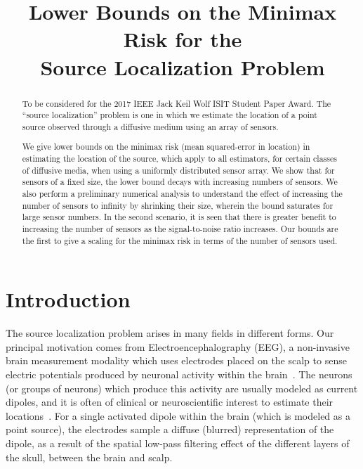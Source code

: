 \documentclass[conference]{IEEEtran}
\title{Lower Bounds on the Minimax Risk for the \\ Source Localization Problem}
\author{
	\IEEEauthorblockN{
		Praveen Venkatesh (\href{mailto:vpraveen@cmu.edu}{\texttt{vpraveen@cmu.edu}}) %
		and Pulkit Grover (\href{mailto:pulkit@cmu.edu}{\texttt{pulkit@cmu.edu}}) %
	}
}
\begin{document}
\maketitle
\thispagestyle{plain}
\pagestyle{plain}

\begin{abstract}

To be considered for the 2017 IEEE Jack Keil Wolf ISIT Student Paper Award.
The ``source localization'' problem is one in which we estimate the location of
a point source observed through a diffusive medium using an array of sensors.

We give lower bounds on the minimax risk (mean squared-error in location) in
estimating the location of the source, which apply to all estimators, for
certain classes of diffusive media, when using a uniformly distributed sensor
array. We show that for sensors of a fixed size, the lower bound decays with
increasing numbers of sensors. We also perform a preliminary numerical analysis
to understand the effect of increasing the number of sensors to infinity by
shrinking their size, wherein the bound saturates for large sensor numbers.  In
the second scenario, it is seen that there is greater benefit to increasing the
number of sensors as the signal-to-noise ratio increases.  Our bounds are the
first to give a scaling for the minimax risk in terms of the number of sensors
used.


\end{abstract}

\section{Introduction}

The source localization problem arises in many fields in different forms. Our
principal motivation comes from Electroencephalography (EEG), a non-invasive
brain measurement modality which uses electrodes placed on the scalp to sense
electric potentials produced by neuronal activity within the
brain~\cite{Nunez2006Electric}. The neurons (or groups of neurons) which
produce this activity are usually modeled as current dipoles, and it is often
of clinical or neuroscientific interest to estimate their
locations~\cite{Baillet2001Electromagnetic}. For a single activated dipole
within the brain (which is modeled as a point source), the electrodes sample a
diffuse (blurred) representation of the dipole, as a result of the spatial
low-pass filtering effect of the different layers of the skull, between the
brain and scalp.
\end{document}
